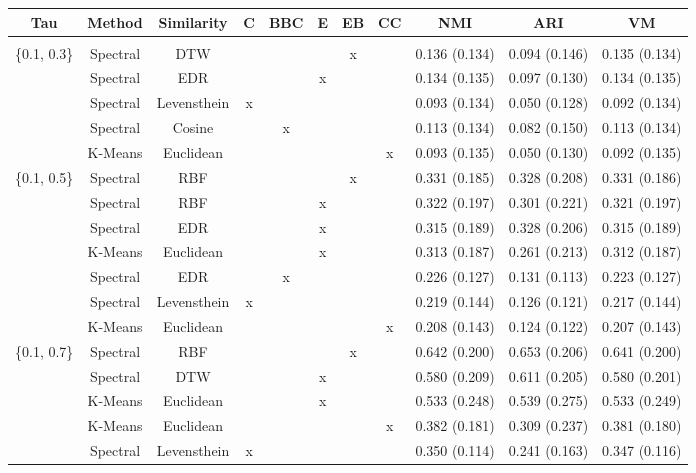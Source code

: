 \documentclass[12pt,a4paper,bibliography=totocnumbered,listof=totocnumbered]{scrartcl}
\begin{document}
{\begin{appendix}
\begin{table}[H] \centering 
	\label{} 
	\scriptsize
	\begin{tabularx}{\textwidth}{ ccccccccccc} 
		\\\toprule
		Tau & Method & Similarity & C & BBC & E & EB & CC & NMI & ARI & VM \\ 
		\hline \\[-1.8ex] 
		\{0.1, 0.3\} & Spectral & DTW &  &  &  & x &  & 0.136 (0.134) & 0.094 (0.146) & 0.135 (0.134) \\ 
		& Spectral & EDR &  &  & x &  &  & 0.134 (0.135) & 0.097 (0.130) & 0.134 (0.135) \\ 
		& Spectral & Levensthein & x &  &  &  &  & 0.093 (0.134) & 0.050 (0.128) & 0.092 (0.134) \\ 
		& Spectral & Cosine &  & x &  &  &  & 0.113 (0.134) & 0.082 (0.150) & 0.113 (0.134) \\ 
		& K-Means & Euclidean &  &  &  &  & x & 0.093 (0.135) & 0.050 (0.130) & 0.092 (0.135) \\ 
		\{0.1, 0.5\} & Spectral & RBF &  &  &  & x &  & 0.331 (0.185) & 0.328 (0.208) & 0.331 (0.186) \\ 
		& Spectral & RBF &  &  & x &  &  & 0.322 (0.197) & 0.301 (0.221) & 0.321 (0.197) \\ 
		& Spectral & EDR &  &  & x &  &  & 0.315 (0.189) & 0.328 (0.206) & 0.315 (0.189) \\ 
		& K-Means & Euclidean &  &  & x &  &  & 0.313 (0.187) & 0.261 (0.213) & 0.312 (0.187) \\ 
		& Spectral & EDR &  & x &  &  &  & 0.226 (0.127) & 0.131 (0.113) & 0.223 (0.127) \\ 
		& Spectral & Levensthein & x &  &  &  &  & 0.219 (0.144) & 0.126 (0.121) & 0.217 (0.144) \\ 
		& K-Means & Euclidean &  &  &  &  & x & 0.208 (0.143) & 0.124 (0.122) & 0.207 (0.143) \\ 
		\{0.1, 0.7\} & Spectral & RBF &  &  &  & x &  & 0.642 (0.200) & 0.653 (0.206) & 0.641 (0.200) \\ 
		& Spectral & DTW &  &  & x &  &  & 0.580 (0.209) & 0.611 (0.205) & 0.580 (0.201) \\ 
		& K-Means & Euclidean &  &  & x &  &  & 0.533 (0.248) & 0.539 (0.275) & 0.533 (0.249) \\ 
		& K-Means & Euclidean &  &  &  &  & x & 0.382 (0.181) & 0.309 (0.237) & 0.381 (0.180) \\ 
		& Spectral & Levensthein & x &  &  &  &  & 0.350 (0.114) & 0.241 (0.163) & 0.347 (0.116) \\ 

\end{tabularx}
\end{table}
\end{appendix}}
\end{document}
